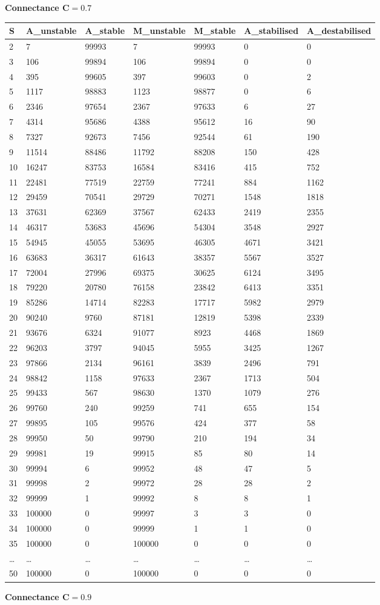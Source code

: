 \documentclass[]{article}
\begin{document}
\textbf{Connectance \(\mathbf{C = 0.7}\)}

\begin{longtable}[]{@{}lllllll@{}}
\toprule
S & A\_unstable & A\_stable & M\_unstable & M\_stable & A\_stabilised &
A\_destabilised\tabularnewline
\midrule
\endhead
2 & 7 & 99993 & 7 & 99993 & 0 & 0\tabularnewline
3 & 106 & 99894 & 106 & 99894 & 0 & 0\tabularnewline
4 & 395 & 99605 & 397 & 99603 & 0 & 2\tabularnewline
5 & 1117 & 98883 & 1123 & 98877 & 0 & 6\tabularnewline
6 & 2346 & 97654 & 2367 & 97633 & 6 & 27\tabularnewline
7 & 4314 & 95686 & 4388 & 95612 & 16 & 90\tabularnewline
8 & 7327 & 92673 & 7456 & 92544 & 61 & 190\tabularnewline
9 & 11514 & 88486 & 11792 & 88208 & 150 & 428\tabularnewline
10 & 16247 & 83753 & 16584 & 83416 & 415 & 752\tabularnewline
11 & 22481 & 77519 & 22759 & 77241 & 884 & 1162\tabularnewline
12 & 29459 & 70541 & 29729 & 70271 & 1548 & 1818\tabularnewline
13 & 37631 & 62369 & 37567 & 62433 & 2419 & 2355\tabularnewline
14 & 46317 & 53683 & 45696 & 54304 & 3548 & 2927\tabularnewline
15 & 54945 & 45055 & 53695 & 46305 & 4671 & 3421\tabularnewline
16 & 63683 & 36317 & 61643 & 38357 & 5567 & 3527\tabularnewline
17 & 72004 & 27996 & 69375 & 30625 & 6124 & 3495\tabularnewline
18 & 79220 & 20780 & 76158 & 23842 & 6413 & 3351\tabularnewline
19 & 85286 & 14714 & 82283 & 17717 & 5982 & 2979\tabularnewline
20 & 90240 & 9760 & 87181 & 12819 & 5398 & 2339\tabularnewline
21 & 93676 & 6324 & 91077 & 8923 & 4468 & 1869\tabularnewline
22 & 96203 & 3797 & 94045 & 5955 & 3425 & 1267\tabularnewline
23 & 97866 & 2134 & 96161 & 3839 & 2496 & 791\tabularnewline
24 & 98842 & 1158 & 97633 & 2367 & 1713 & 504\tabularnewline
25 & 99433 & 567 & 98630 & 1370 & 1079 & 276\tabularnewline
26 & 99760 & 240 & 99259 & 741 & 655 & 154\tabularnewline
27 & 99895 & 105 & 99576 & 424 & 377 & 58\tabularnewline
28 & 99950 & 50 & 99790 & 210 & 194 & 34\tabularnewline
29 & 99981 & 19 & 99915 & 85 & 80 & 14\tabularnewline
30 & 99994 & 6 & 99952 & 48 & 47 & 5\tabularnewline
31 & 99998 & 2 & 99972 & 28 & 28 & 2\tabularnewline
32 & 99999 & 1 & 99992 & 8 & 8 & 1\tabularnewline
33 & 100000 & 0 & 99997 & 3 & 3 & 0\tabularnewline
34 & 100000 & 0 & 99999 & 1 & 1 & 0\tabularnewline
35 & 100000 & 0 & 100000 & 0 & 0 & 0\tabularnewline
\ldots{} & \ldots{} & \ldots{} & \ldots{} & \ldots{} & \ldots{} &
\ldots{}\tabularnewline
50 & 100000 & 0 & 100000 & 0 & 0 & 0\tabularnewline
\bottomrule
\end{longtable}

\textbf{Connectance \(\mathbf{C = 0.9}\)}
\end{document}
